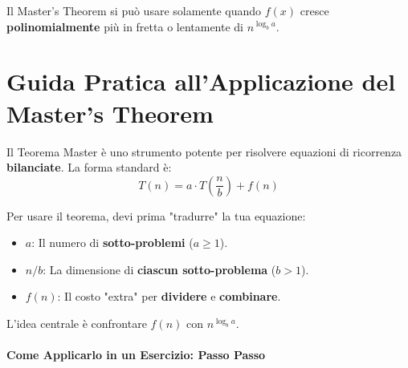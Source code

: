 \begin{observation}
	Il Master's Theorem si può usare solamente quando $f(x)$ cresce \textbf{polinomialmente} più in fretta o lentamente di $n^{\log_b{a}}$.
\end{observation}


\newpage
\section{Guida Pratica all'Applicazione del Master's Theorem}

Il Teorema Master è uno strumento potente per risolvere equazioni di ricorrenza \textbf{bilanciate}.
La forma standard è:
\[
    T(n) = a \cdot T(\frac{n}{b}) + f(n)
\]

\begin{observation}
Per usare il teorema, devi prima "tradurre" la tua equazione:
\begin{itemize}
	\item \textbf{$a$}: Il numero di \textbf{sotto-problemi} ($a \geq 1$).
	\item \textbf{$n/b$}: La dimensione di \textbf{ciascun sotto-problema} ($b > 1$).
	\item \textbf{$f(n)$}: Il costo "extra" per \textbf{dividere} e \textbf{combinare}.
\end{itemize}
L'idea centrale è confrontare $f(n)$ con $n^{\log_b{a}}$.
\end{observation}

\paragraph{Come Applicarlo in un Esercizio: Passo Passo}

